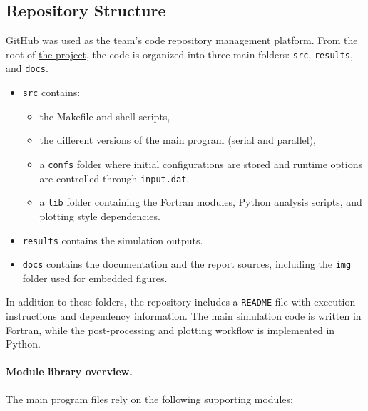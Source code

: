 \subsection{Repository Structure}\label{repository-structure}

GitHub was used as the team's code repository management platform. From the root of
\href{https://github.com/Eines-Informatiques-Avancades/Project_2026_II}{the project},
the code is organized into three main folders: \texttt{src}, \texttt{results}, and \texttt{docs}.

\begin{itemize}
  \item \texttt{src} contains:
  \begin{itemize}
    \item the Makefile and shell scripts,
    \item the different versions of the main program (serial and parallel),
    \item a \texttt{confs} folder where initial configurations are stored and runtime options are controlled through \texttt{input.dat},
    \item a \texttt{lib} folder containing the Fortran modules, Python analysis scripts, and plotting style dependencies.
  \end{itemize}
  \item \texttt{results} contains the simulation outputs.
  \item \texttt{docs} contains the documentation and the report sources, including the \texttt{img} folder used for embedded figures.
\end{itemize}

In addition to these folders, the repository includes a \texttt{README} file with execution instructions and dependency information. The main simulation code is written in Fortran, while the post-processing and plotting workflow is implemented in Python.

\paragraph{Module library overview.}
The main program files rely on the following supporting modules:

